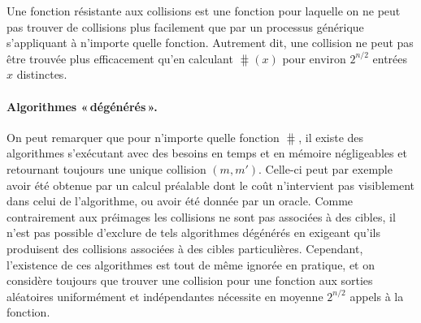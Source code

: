 Une fonction résistante aux collisions est une fonction pour laquelle on ne peut pas trouver
de collisions plus facilement que par un processus générique s'appliquant à n'importe quelle fonction. Autrement dit,
une collision ne peut pas être trouvée plus efficacement qu'en calculant $\hash(x)$ pour environ $2^{n/2}$ entrées $x$ distinctes.

\paragraph{Algorithmes «\,dégénérés\,».} On peut remarquer que pour n'importe quelle fonction $\hash$, il existe
des algorithmes s'exécutant avec des besoins en temps et en mémoire négligeables
et retournant toujours une unique collision $(m,m')$. Celle-ci
peut par exemple avoir été obtenue par un calcul préalable dont le coût n'intervient pas visiblement dans celui
de l'algorithme, ou avoir été donnée par un oracle.
Comme contrairement aux préimages les collisions ne sont pas associées à des cibles, il n'est pas
possible d'exclure de tels algorithmes dégénérés en exigeant qu'ils produisent des collisions associées à des
cibles particulières. Cependant, l'existence de ces algorithmes est tout de même ignorée en pratique, et on considère
toujours que trouver une collision pour une fonction aux sorties aléatoires uniformément et indépendantes nécessite en
moyenne $2^{n/2}$ appels à la fonction.


